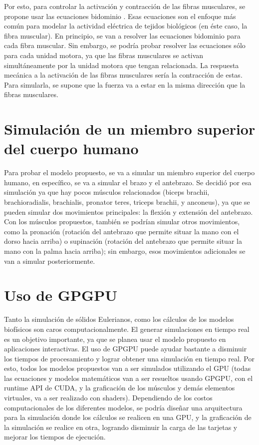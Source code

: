 Por esto, para controlar la activación y contracción de las fibras musculares, se propone usar las ecuaciones bidominio \citep{vigmond2002computational, rohrle2010simulating, rohrle2012physiologically}. Esas ecuaciones son el enfoque más común para modelar la actividad eléctrica de tejidos biológicos (en éste caso, la fibra muscular). En principio, se van a resolver las ecuaciones bidominio para cada fibra muscular. Sin embargo, se podría probar resolver las ecuaciones sólo para cada unidad motora, ya que las fibras musculares se activan simultáneamente por la unidad motora que tengan relacionada. La respuesta mecánica a la activación de las fibras musculares sería la contracción de estas. Para simularla, se supone que la fuerza va a estar en la misma dirección que la fibras musculares.

\section{Simulación de un miembro superior del cuerpo humano}

Para probar el modelo propuesto, se va a simular un miembro superior del cuerpo humano, en específico, se va a simular el brazo y el antebrazo. Se decidió por esa simulación ya que hay pocos músculos relacionados (biceps brachii, brachioradialis, brachialis, pronator teres, triceps brachii, y anconeus), ya que se pueden simular dos movimientos principales: la flexión y extensión del antebrazo. Con los músculos propuestos, también se podrían simular otros movimientos, como la pronación (rotación del antebrazo que permite situar la mano con el dorso hacia arriba) o supinación (rotación del antebrazo que permite situar la mano con la palma hacia arriba); sin embargo, esos movimientos adicionales se van a simular posteriormente.

\section{Uso de GPGPU}

Tanto la simulación de sólidos Eulerianos, como los cálculos de los modelos biofísicos son caros computacionalmente. El generar simulaciones en tiempo real es un objetivo importante, ya que se planea usar el modelo propuesto en aplicaciones interactivas. El uso de GPGPU puede ayudar bastante a disminuir los tiempos de procesamiento y lograr obtener una simulación en tiempo real. Por esto, todos los modelos propuestos van a ser simulados utilizando el GPU (todas las ecuaciones y modelos matemáticos van a ser resueltos usando GPGPU, con el runtime API de CUDA, y la graficación de los músculos y demás elementos virtuales, va a ser realizado con shaders). Dependiendo de los costos computacionales de los diferentes modelos, se podría diseñar una arquitectura para la simulación donde los cálculos se realicen en una GPU, y la graficación de la simulación se realice en otra, logrando disminuir la carga de las tarjetas y mejorar los tiempos de ejecución.

